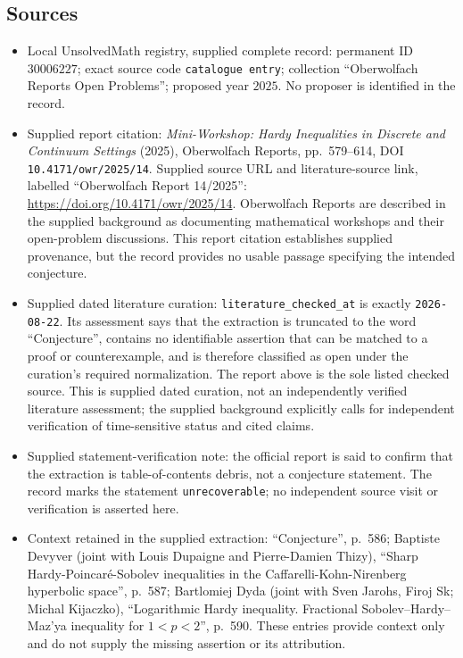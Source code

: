 \documentclass[11pt]{article}
\begin{document}
\subsection{Sources}
\begin{itemize}
\item Local UnsolvedMath registry, supplied complete record: permanent ID \(30006227\); exact source code \texttt{catalogue entry}; collection ``Oberwolfach Reports Open Problems''; proposed year \(2025\). No proposer is identified in the record.
\item Supplied report citation: \emph{Mini-Workshop: Hardy Inequalities in Discrete and Continuum Settings} (2025), Oberwolfach Reports, pp.~579--614, DOI \texttt{10.4171/owr/2025/14}. Supplied source URL and literature-source link, labelled ``Oberwolfach Report 14/2025'': \url{https://doi.org/10.4171/owr/2025/14}. Oberwolfach Reports are described in the supplied background as documenting mathematical workshops and their open-problem discussions. This report citation establishes supplied provenance, but the record provides no usable passage specifying the intended conjecture.
\item Supplied dated literature curation: \texttt{literature\_checked\_at} is exactly \texttt{2026-08-22}. Its assessment says that the extraction is truncated to the word ``Conjecture'', contains no identifiable assertion that can be matched to a proof or counterexample, and is therefore classified as open under the curation's required normalization. The report above is the sole listed checked source. This is supplied dated curation, not an independently verified literature assessment; the supplied background explicitly calls for independent verification of time-sensitive status and cited claims.
\item Supplied statement-verification note: the official report is said to confirm that the extraction is table-of-contents debris, not a conjecture statement. The record marks the statement \texttt{unrecoverable}; no independent source visit or verification is asserted here.
\item Context retained in the supplied extraction: ``Conjecture'', p.~586; Baptiste Devyver (joint with Louis Dupaigne and Pierre-Damien Thizy), ``Sharp Hardy-Poincaré-Sobolev inequalities in the Caffarelli-Kohn-Nirenberg hyperbolic space'', p.~587; Bartlomiej Dyda (joint with Sven Jarohs, Firoj Sk; Michal Kijaczko), ``Logarithmic Hardy inequality. Fractional Sobolev--Hardy--Maz'ya inequality for \(1<p<2\)'', p.~590. These entries provide context only and do not supply the missing assertion or its attribution.

\end{itemize}
\end{document}
